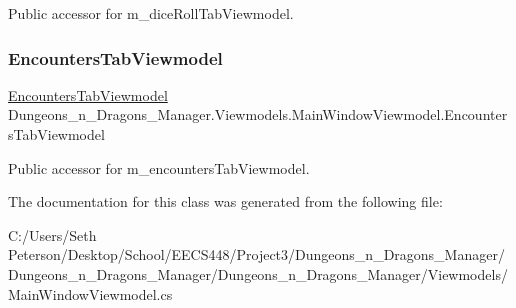 Public accessor for m\+\_\+dice\+Roll\+Tab\+Viewmodel. 

\mbox{\label{class_dungeons__n___dragons___manager_1_1_viewmodels_1_1_main_window_viewmodel_ad45b420b4188c0308f9c338ac4123cf9}} 
\subsubsection{\texorpdfstring{Encounters\+Tab\+Viewmodel}{EncountersTabViewmodel}}
{\footnotesize\ttfamily \mbox{\hyperlink{class_dungeons__n___dragons___manager_1_1_viewmodels_1_1_encounters_tab_viewmodel}{Encounters\+Tab\+Viewmodel}} Dungeons\+\_\+n\+\_\+\+Dragons\+\_\+\+Manager.\+Viewmodels.\+Main\+Window\+Viewmodel.\+Encounters\+Tab\+Viewmodel\hspace{0.3cm}{\ttfamily [get]}}



Public accessor for m\+\_\+encounters\+Tab\+Viewmodel. 



The documentation for this class was generated from the following file\+:\begin{DoxyCompactItemize}
\item 
C\+:/\+Users/\+Seth Peterson/\+Desktop/\+School/\+E\+E\+C\+S448/\+Project3/\+Dungeons\+\_\+n\+\_\+\+Dragons\+\_\+\+Manager/\+Dungeons\+\_\+n\+\_\+\+Dragons\+\_\+\+Manager/\+Dungeons\+\_\+n\+\_\+\+Dragons\+\_\+\+Manager/\+Viewmodels/Main\+Window\+Viewmodel.\+cs\end{DoxyCompactItemize}
